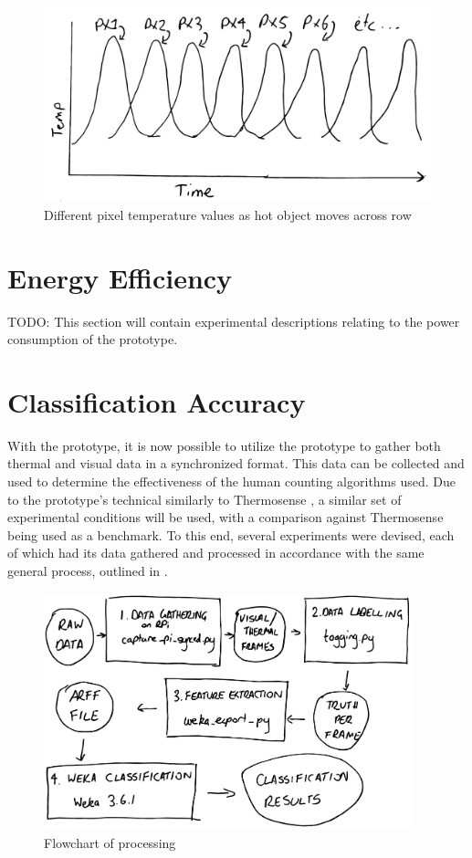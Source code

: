 \documentclass[../thesis/thesis.tex]{subfiles}
\begin{document}
\begin{figure}
\centering
\includegraphics[width=\textwidth]{../diagrams/temp/motion.pdf}
\caption{Different \mlx pixel temperature values as hot object moves across row}
\label{fig:hotmotion}
\end{figure}

\section{Energy Efficiency}

TODO: This section will contain experimental descriptions relating to the power consumption of the prototype.

\section{Classification Accuracy}

With the prototype, it is now possible to utilize the prototype to gather both thermal and visual data in a synchronized format. This data can be collected and used to determine the effectiveness of the human counting algorithms used. Due to the prototype's technical similarly to Thermosense \cite{beltran2013thermosense}, a similar set of experimental conditions will be used, with a comparison against Thermosense being used as a benchmark. To this end, several experiments were devised, each of which had its data gathered and processed in accordance with the same general process, outlined in .

\begin{figure}
\centering
\includegraphics[width=0.95\textwidth]{../diagrams/temp/method-flowchart.pdf}
\caption{Flowchart of processing}
\label{fig:methods:flowchart}
\end{figure}
\end{document}
